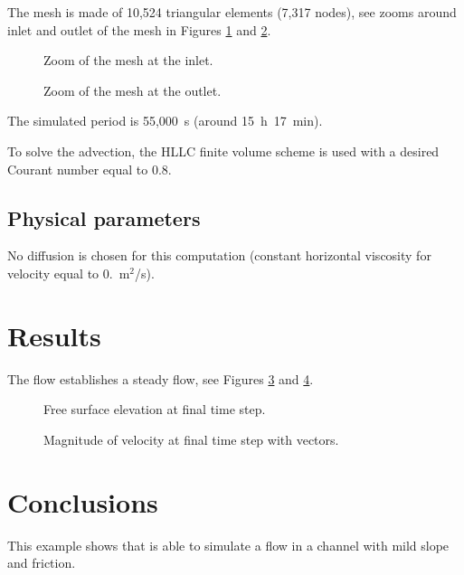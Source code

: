 The mesh is made of 10,524 triangular elements (7,317 nodes),
see zooms around inlet and outlet of the mesh in Figures
\ref{t2d:Friction:fig:meshin} and \ref{t2d:Friction:fig:meshout}.

\begin{figure}[!htbp]
 \centering
 \caption{Zoom of the mesh at the inlet.}
 \label{t2d:Friction:fig:meshin}
\end{figure}

\begin{figure}[!htbp]
 \centering
 \caption{Zoom of the mesh at the outlet.}
 \label{t2d:Friction:fig:meshout}
\end{figure}

The simulated period is 55,000~s (around 15~h~17~min).

To solve the advection, the HLLC finite volume scheme is used with a desired Courant number equal to 0.8.

\subsection{Physical parameters}

No diffusion is chosen for this computation (constant horizontal viscosity for
velocity equal to 0.~m$^2$/s).

\section{Results}

The flow establishes a steady flow, see Figures \ref{t2d:Friction:freesurf} and
\ref{t2d:Friction:velovect}.

\begin{figure}[H]
\centering
{}
\caption{Free surface elevation at final time step.}
\label{t2d:Friction:freesurf}
\end{figure}

\begin{figure}[H]
\centering
{}
\caption{Magnitude of velocity at final time step with vectors.}
\label{t2d:Friction:velovect}
\end{figure}


\section{Conclusions}

This example shows that  is able to simulate a flow
in a channel with mild slope and friction.
